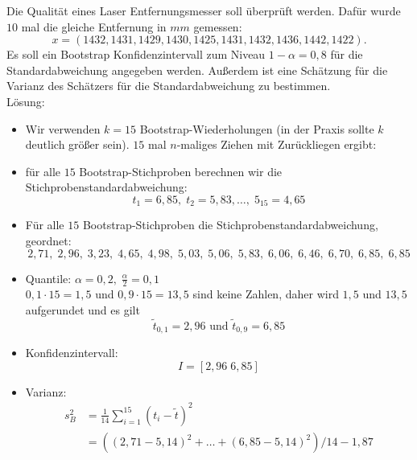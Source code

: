  Die Qualität eines Laser Entfernungsmesser soll überprüft werden. Dafür wurde $10$ mal die gleiche Entfernung in $\unit{mm}$ gemessen:
$$x=(1432,1431,1429,1430,1425,1431,1432,1436,1442,1422)\text{.}$$
Es soll ein Bootstrap Konfidenzintervall zum Niveau $1-\alpha = 0,8$ für die Standardabweichung angegeben werden. Außerdem ist eine Schätzung für die Varianz des Schätzers für die Standardabweichung zu bestimmen.\\
Lösung:
\begin{itemize}
\item Wir verwenden $k=15$ Bootstrap-Wiederholungen (in der Praxis sollte $k$ deutlich größer sein). $15$ mal $n$-maliges Ziehen mit Zurückliegen ergibt:
\item für alle $15$ Bootstrap-Stichproben berechnen wir die Stichprobenstandardabweichung:
$$t_1=6,85, \; t_2 = 5,83,\ldots, \; 5_{15}=4,65$$
\item Für alle $15$ Bootstrap-Stichproben die Stichprobenstandardabweichung, geordnet:
$$2,71,\; 2,96, \; 3,23,\; 4,65,\; 4,98,\; 5,03,\; 5,06,\; 5,83,\; 6,06,\; 6,46,\; 6,70,\; 6,85,\; 6,85$$
\item Quantile: $\alpha = 0,2, \; \frac{\alpha}{2}=0,1$\\
$0,1 \cdot 15 = 1,5$ und $0,9 \cdot 15 = 13,5$ sind keine Zahlen, daher wird $1,5$ und $13,5$ aufgerundet und es gilt
$$\tilde{t}_{0,1}=2,96 \text{ und } \tilde{t}_{0,9}=6,85$$
\item Konfidenzintervall:
$$I=[2,96\; 6,85]$$
\item Varianz:
\begin{align*}
s_B^2&=\frac{1}{14}\sum_{i=1}^15 (t_i-\tilde{t})^2\\
&= ((2,71-5,14)^2 + \ldots + (6,85-5,14)^2)/14-1,87
\end{align*}
\end{itemize} 

